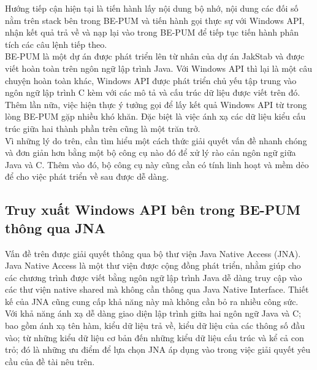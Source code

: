 Hướng tiếp cận hiện tại là tiến hành lấy nội dung bộ nhớ, nội dung các đối số nằm trên stack bên trong BE-PUM và tiến hành gọi thực sự với Windows API, nhận kết quả trả về và nạp lại vào trong BE-PUM để tiếp tục tiến hành phân tích các câu lệnh tiếp theo.\\

BE-PUM là một dự án được phát triển lên từ nhân của dự án JakStab và được viết hoàn toàn trên ngôn ngữ lập trình Java. Với Windows API thì lại là một câu chuyện hoàn toàn khác, Windows API được phát triển chủ yếu tập trung vào ngôn ngữ lập trình C kèm với các mô tả và cấu trúc dữ liệu được viết trên đó. Thêm lần nữa, việc hiện thực ý tưởng gọi để lấy kết quả Windows API từ trong lòng BE-PUM gặp nhiều khó khăn. Đặc biệt là việc ánh xạ các dữ liệu kiểu cấu trúc giữa hai thành phần trên cũng là một trăn trở.\\

Vì những lý do trên, cần tìm hiểu một cách thức giải quyết vấn đề nhanh chóng và đơn giản hơn bằng một bộ công cụ nào đó để xử lý rào cản ngôn ngữ giữa Java và C. Thêm vào đó, bộ công cụ này cũng cần có tính linh hoạt và mềm dẻo để cho việc phát triển về sau được dễ dàng.




	\subsection{Truy xuất Windows API bên trong BE-PUM thông qua JNA}

Vấn đề trên được giải quyết thông qua bộ thư viện Java Native Access (JNA).\\

Java Native Access là một thư viện được cộng đồng phát triển, nhằm giúp cho các chương trình được viết bằng ngôn ngữ lập trình Java dễ dàng truy cập vào các thư viện native shared mà không cần thông qua Java Native Interface. Thiết kế của JNA cũng cung cấp khả năng này mà không cần bỏ ra nhiều công sức.\\

Với khả năng ánh xạ dễ dàng giao diện lập trình giữa hai ngôn ngữ Java và C; bao gồm ánh xạ tên hàm, kiểu dữ liệu trả về, kiểu dữ liệu của các thông số đầu vào; từ những kiểu dữ liệu cơ bản đến những kiểu dữ liệu cấu trúc và kể cả con trỏ; đó là những ưu điểm để lựa chọn JNA áp dụng vào trong việc giải quyết yêu cầu của đề tài nêu trên.